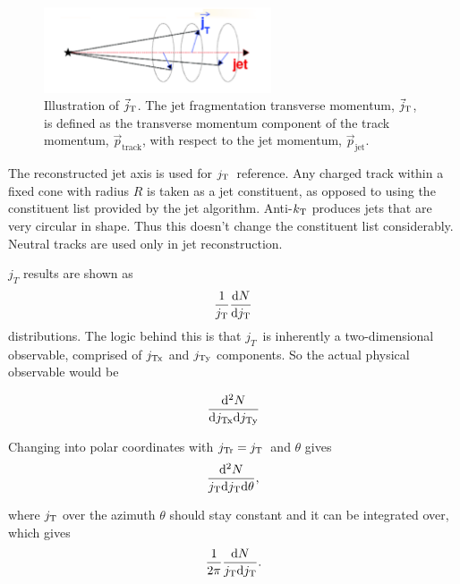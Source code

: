   \begin{figure}
    \begin{center}
      \includegraphics[width = 0.60\textwidth]{figures/jt_def}
    \end{center}
    \caption{Illustration of $\vec{j}_{\rm T}$. The jet fragmentation transverse momentum, $\vec{j}_{\rm T}$, is defined as the transverse momentum component of the track momentum, $\vec{p}_{\mathrm{track}}$, with respect to the jet momentum, $\vec{p}_{\mathrm{jet}}$.}
    \label{fig:jtdefinition}
  \end{figure}

The reconstructed jet axis is used for $j_{\rm T}$ reference. Any charged track within a fixed cone with radius $R$ is taken as a jet constituent, as opposed to using the constituent list provided by the jet algorithm. Anti-$k_{\rm T}$ produces jets that are very circular in shape. Thus this doesn't change the constituent list considerably. Neutral tracks are used only in jet reconstruction.
 
$j_T$ results are shown as 
\begin{equation}
\frac{1}{j_{\rm T}}\frac{\mathrm{d}N}{\mathrm{d}j_{\rm T}}
\end{equation}
distributions. The logic behind this is that $j_T$ is inherently a two-dimensional observable, comprised of $j_{\rm Tx}$ and $j_{\rm Ty}$ components. So the actual physical observable would be 
 
 \begin{equation}
 \frac{\mathrm{d}^2N}{\mathrm{d} j_{\rm Tx} \mathrm{d} j_{\rm Ty}}
 \end{equation}

 Changing into polar coordinates with $j_{\rm Tr} = j_{\rm T}$ and $\theta$ gives
 \begin{equation}
 \frac{\mathrm{d}^2N}{j_{\rm T} \mathrm{d} j_{\rm T} \mathrm{d} \theta},
 \end{equation}

where $j_{\rm T}$ over the azimuth $\theta$ should stay constant and it can be integrated over, which gives 
\begin{equation}
\frac{1}{2\pi}\frac{\mathrm{d}N}{j_{\rm T} \mathrm{d} j_{\rm T}}.
 \end{equation}

